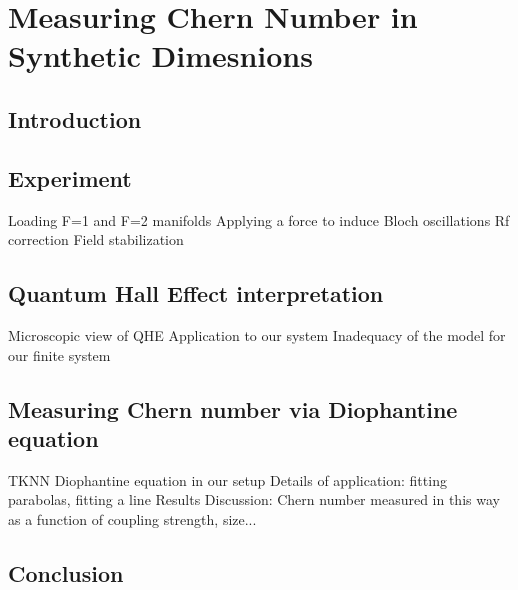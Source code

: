 \renewcommand{\thechapter}{6}

\chapter{Measuring Chern Number in Synthetic Dimesnions}\label{chap:BlochOsc}

\section{Introduction}

\section{Experiment}
	Loading F=1 and F=2 manifolds
	Applying a force to induce Bloch oscillations
	Rf correction
	Field stabilization

\section{Quantum Hall Effect interpretation}
	Microscopic view of QHE
	Application to our system
	Inadequacy of the model for our finite system

\section{Measuring Chern number via Diophantine equation}
	TKNN Diophantine equation in our setup
	Details of application: fitting parabolas, fitting a line
	Results
	Discussion: Chern number measured in this way as a function of coupling strength, size...

\section{Conclusion}

